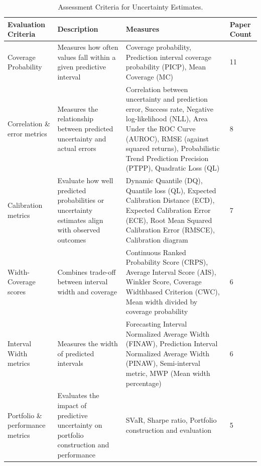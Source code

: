 \begin{table}[H]
    \centering
    \caption[Evaluation Criteria for Uncertainty Quantification]{Assessment Criteria for Uncertainty Estimates.}
    \label{table:evaluation_criteria}
    \small
    \begin{adjustbox}{width=0.5\textwidth,center}
    \begin{tabular}{p{}p{}p{}p{}}
        \toprule
        \textbf{Evaluation Criteria} & \textbf{Description} & \textbf{Measures} & \textbf{Paper Count} \\
        \midrule
        Coverage Probability & Measures how often values fall within a given predictive interval & Coverage probability, Prediction interval coverage probability (PICP), Mean Coverage (MC) & 11 \\
        \addlinespace
        \hdashline[0.2pt/3pt]
        \addlinespace
        Correlation \& error metrics & Measures the relationship between predicted uncertainty and actual errors & Correlation between uncertainty and prediction error, Success rate, Negative log-likelihood (NLL), Area Under the ROC Curve (AUROC), RMSE (against squared returns), Probabilistic Trend Prediction Precision (PTPP), Quadratic Loss (QL) & 8 \\
        \addlinespace
        \hdashline[0.2pt/3pt]
        \addlinespace
        Calibration metrics & Evaluate how well predicted probabilities or uncertainty estimates align with observed outcomes & Dynamic Quantile (DQ), Quantile loss (QL), Expected Calibration Distance (ECD), Expected Calibration Error (ECE), Root Mean Squared Calibration Error (RMSCE), Calibration diagram & 7 \\
        \addlinespace
        \hdashline[0.2pt/3pt]
        \addlinespace
        Width-Coverage scores & Combines trade-off between interval width and coverage  & Continuous Ranked Probability Score (CRPS), Average Interval Score (AIS), Winkler Score, Coverage Widthbased Criterion (CWC), Mean width divided by coverage probability & 6 \\
        \addlinespace
        \hdashline[0.2pt/3pt]
        \addlinespace
        Interval Width metrics & Measures the width of predicted intervals & Forecasting Interval Normalized Average Width (FINAW), Prediction Interval Normalized Average Width (PINAW), Semi-interval metric, MWP (Mean width percentage) & 6 \\
        \addlinespace
        \hdashline[0.2pt/3pt]
        \addlinespace
        Portfolio \& performance metrics & Evaluates the impact of predictive uncertainty on portfolio construction and performance & SVaR, Sharpe ratio, Portfolio construction and evaluation & 5 \\

\end{tabular}
\end{adjustbox}
\end{table}
